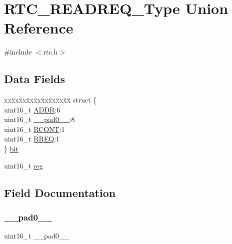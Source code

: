\hypertarget{union_r_t_c___r_e_a_d_r_e_q___type}{}\section{R\+T\+C\+\_\+\+R\+E\+A\+D\+R\+E\+Q\+\_\+\+Type Union Reference}
\label{union_r_t_c___r_e_a_d_r_e_q___type}


{\ttfamily \#include $<$rtc.\+h$>$}

\subsection*{Data Fields}
\begin{DoxyCompactItemize}
\item 
\begin{tabbing}
xx\=xx\=xx\=xx\=xx\=xx\=xx\=xx\=xx\=\kill
struct \{\\
\>uint16\_t \mbox{\hyperlink{union_r_t_c___r_e_a_d_r_e_q___type_af23088f0ffe25072ffa5ef29e495780e}{ADDR}}:6\\
\>uint16\_t \mbox{\hyperlink{union_r_t_c___r_e_a_d_r_e_q___type_a77132c2c26a75f5b8751b235cda23828}{\_\_pad0\_\_}}:8\\
\>uint16\_t \mbox{\hyperlink{union_r_t_c___r_e_a_d_r_e_q___type_a25bffea6638615e449f26f4c3d5caef7}{RCONT}}:1\\
\>uint16\_t \mbox{\hyperlink{union_r_t_c___r_e_a_d_r_e_q___type_ab04769594ab04e8b80a1165d5bd5794e}{RREQ}}:1\\
\} \mbox{\hyperlink{union_r_t_c___r_e_a_d_r_e_q___type_ac98ae659b254990ab5540a46688f333e}{bit}}\\

\end{tabbing}\item 
uint16\+\_\+t \mbox{\hyperlink{union_r_t_c___r_e_a_d_r_e_q___type_a11760f5020019f4aa8cb02e694f7cc44}{reg}}
\end{DoxyCompactItemize}


\subsection{Field Documentation}
\mbox{\label{union_r_t_c___r_e_a_d_r_e_q___type_a77132c2c26a75f5b8751b235cda23828}} 
\subsubsection{\texorpdfstring{\_\_pad0\_\_}{\_\_pad0\_\_}}
{\footnotesize\ttfamily uint16\+\_\+t \+\_\+\+\_\+pad0\+\_\+\+\_\+}

